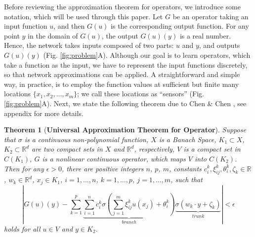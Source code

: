 \documentclass[11pt]{article}
\newtheorem{theorem}{Theorem}
\begin{document}
Before reviewing the approximation theorem for operators, we introduce some notation, which will be used through this paper. Let $G$ be an operator taking an input function $u$, and then $G(u)$ is the corresponding output function. For any point $y$ in the domain of $G(u)$,  the output $G(u)(y)$ is a real number. Hence, the network takes inputs composed of two parts: $u$ and $y$, and outputs $G(u)(y)$ (Fig. \ref{fig:problem}A). Although our goal is to learn operators, which take a function as the input, we have to represent the input functions discretely, so that network approximations can be applied. A straightforward and simple way, in practice, is to employ the function values at sufficient but finite many locations $\{x_1, x_2, \dots, x_m\}$; we call these locations as ``sensors'' (Fig. \ref{fig:problem}A). Next, we state the following theorem due to Chen \& Chen \cite{chen1995universal}, see appendix for more details.

\begin{theorem}[\textbf{Universal Approximation Theorem for Operator}]
\label{thm:main}
Suppose that $\sigma$ is a continuous non-polynomial function, $X$ is a Banach Space, $K_1 \subset X$, $K_2 \subset \mathbb{R}^d$ are two compact sets in $X$ and $\mathbb{R}^d$, respectively, $V$ is a compact set in $C(K_1)$, $G$ is a nonlinear continuous operator, which maps $V$ into $C(K_2)$. Then for any $\epsilon>0$, there are positive integers $n$, $p$, $m$, constants $c_i^k, \xi_{ij}^k, \theta_i^k, \zeta_k \in \mathbb{R}$, $w_k \in \mathbb{R}^d$, $x_j \in K_1$, $i=1,\dots,n$, $k=1,\dots,p$, $j=1,\dots,m$, such that
\begin{equation}\label{eq:thm}
\left|G(u)(y) - \sum_{k=1}^p
\underbrace{\sum_{i=1}^n c_i^k \sigma\left(\sum_{j=1}^m \xi_{ij}^ku(x_j)+\theta_i^k\right)}_{branch}
\underbrace{\sigma(w_k \cdot y+\zeta_k)}_{trunk}
\right|<\epsilon  
\end{equation}
holds for all $u \in V$ and $y \in K_2$.
\end{theorem}
\end{document}
